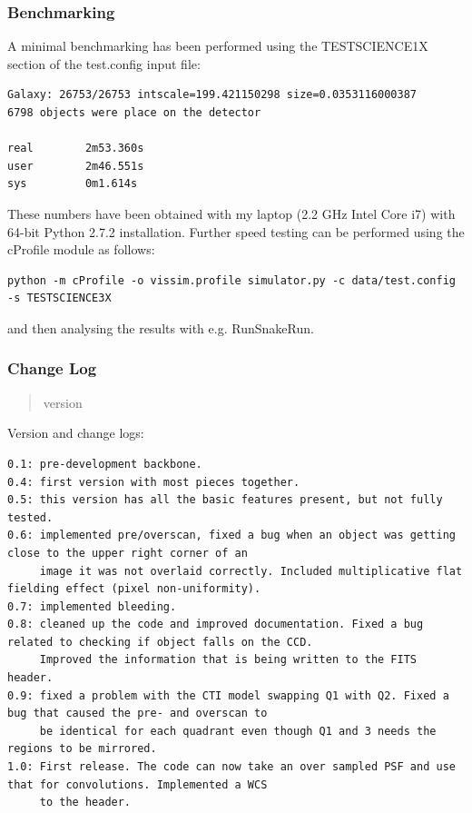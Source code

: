 \documentclass[a4paper,12pt,english]{sphinxmanual}
\begin{document}
\subsubsection{Benchmarking}
\label{simulator:benchmarking}
A minimal benchmarking has been performed using the TESTSCIENCE1X section of the test.config input file:

\begin{Verbatim}[commandchars=\\\{\}]
Galaxy: 26753/26753 intscale=199.421150298 size=0.0353116000387
6798 objects were place on the detector

real        2m53.360s
user        2m46.551s
sys         0m1.614s
\end{Verbatim}

These numbers have been obtained with my laptop (2.2 GHz Intel Core i7) with
64-bit Python 2.7.2 installation. Further speed testing can be performed using the cProfile module
as follows:

\begin{Verbatim}[commandchars=\\\{\}]
python -m cProfile -o vissim.profile simulator.py -c data/test.config -s TESTSCIENCE3X
\end{Verbatim}

and then analysing the results with e.g. RunSnakeRun.


\subsubsection{Change Log}
\label{simulator:change-log}\begin{quote}\begin{description}
\item[{version}] 

\end{description}\end{quote}

Version and change logs:

\begin{Verbatim}[commandchars=\\\{\}]
0.1: pre-development backbone.
0.4: first version with most pieces together.
0.5: this version has all the basic features present, but not fully tested.
0.6: implemented pre/overscan, fixed a bug when an object was getting close to the upper right corner of an
     image it was not overlaid correctly. Included multiplicative flat fielding effect (pixel non-uniformity).
0.7: implemented bleeding.
0.8: cleaned up the code and improved documentation. Fixed a bug related to checking if object falls on the CCD.
     Improved the information that is being written to the FITS header.
0.9: fixed a problem with the CTI model swapping Q1 with Q2. Fixed a bug that caused the pre- and overscan to
     be identical for each quadrant even though Q1 and 3 needs the regions to be mirrored.
1.0: First release. The code can now take an over sampled PSF and use that for convolutions. Implemented a WCS
     to the header.
\end{Verbatim}
\end{document}
